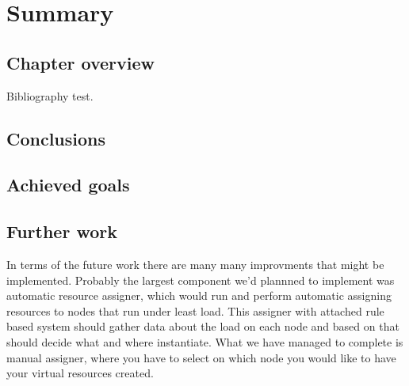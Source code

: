 \documentclass[11pt]{book}
\begin{document}
  \chapter{Summary}

    \section*{Chapter overview}

      Bibliography \cite{mittelbach2004} test.
	
		

    \section{Conclusions}
	
		

    \section{Achieved goals}
	
		

    \section{Further work}
	
	In terms of the future work there are many many improvments that might be implemented. Probably the largest component we'd plannned to implement was automatic resource assigner, which would run
        and perform automatic assigning resources to nodes that run under least load. This assigner with attached rule based system should gather data about the load on each node and based on that should 
        decide what and where instantiate. What we have managed to complete is manual assigner, where you have to select on which node you would like to have your virtual resources created.


  
  
	

\end{document}
